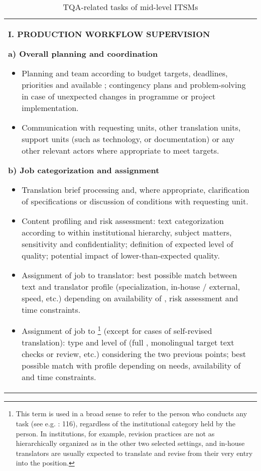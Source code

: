 \documentclass[output=paper]{langsci/langscibook}
\begin{document}
\begin{table}[p]

\caption{\label{tab:prietoramos:4} TQA-related tasks of mid-level ITSMs}
\footnotesize
\begin{tabularx}{\textwidth}{Q}
\lsptoprule 

 \parbox{.9\textwidth}{
\textbf{I. PRODUCTION WORKFLOW SUPERVISION} 



\textbf{a) Overall planning and coordination} 


\begin{itemize}
\item 
Planning and team  according to budget targets, deadlines, priorities and available ; contingency plans and problem-solving in case of unexpected changes in programme or project implementation.
\item 
Communication with requesting units, other translation units, support units (such as technology,  or documentation) or any other relevant actors where appropriate to meet targets.
\end{itemize}

\textbf{b) Job categorization and assignment} 


\begin{itemize}
\item 
Translation brief processing and, where appropriate, clarification of specifications or discussion of conditions with requesting unit.
\item 
Content profiling and risk assessment: text categorization according to  within institutional hierarchy, subject matters, sensitivity and confidentiality; definition of expected level of quality; potential impact of lower-than-expected quality.
\item 
Assignment of job to translator: best possible match between text and translator profile (specialization, in-house / external, speed, etc.) depending on availability of , risk assessment and time constraints.
\item 
Assignment of job to \footnote{This term is used in a broad sense to refer to the person who conducts any  task (see e.g. \citealt{Mossop2014}: 116), regardless of the institutional category held by the person. In  institutions, for example, revision practices are not as hierarchically organized as in the other two selected settings, and in-house translators are usually expected to translate and revise from their very entry into the position.} (except for cases of self-revised translation): type and level of  (full , monolingual target text checks or review, etc.) considering the two previous points; best possible match with  profile depending on  needs, availability of  and time constraints.
\end{itemize}

}
\end{tabularx}
\end{table}
\end{document}
